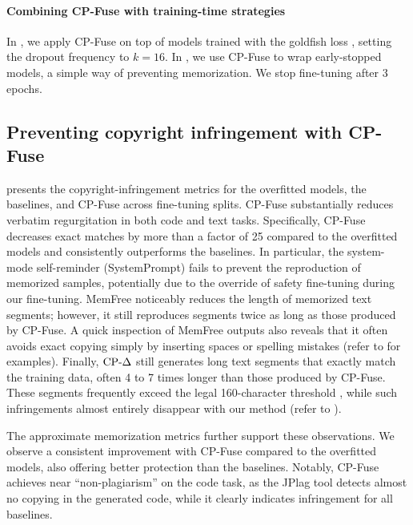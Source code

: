 \paragraph{Combining CP-Fuse with training-time strategies} In , we apply CP-Fuse on top of models trained with the goldfish loss \citep{hans2024like}, setting the dropout frequency to $k=16$. In , we use CP-Fuse to wrap early-stopped models, a simple way of preventing memorization. We stop fine-tuning after 3 epochs.



\subsection{Preventing copyright infringement with CP-Fuse}
\label{sec:exp_copyright}
 presents the copyright-infringement metrics for the overfitted models, the baselines, and CP-Fuse across fine-tuning splits. CP-Fuse substantially reduces verbatim regurgitation in both code and text tasks. Specifically, CP-Fuse decreases exact matches by more than a factor of 25 compared to the overfitted models and consistently outperforms the baselines. In particular, the system-mode self-reminder (SystemPrompt) fails to prevent the reproduction of memorized samples, potentially due to the override of safety fine-tuning during our fine-tuning. MemFree noticeably reduces the length of memorized text segments; however, it still reproduces segments twice as long as those produced by CP-Fuse. A quick inspection of MemFree outputs also reveals that it often avoids exact copying simply by inserting spaces or spelling mistakes (refer to  for examples). Finally, $\text{CP-}\Delta$ still generates long text segments that exactly match the training data, often 4 to 7 times longer than those produced by CP-Fuse. These segments frequently exceed the legal 160-character threshold \citep{mueller2024llms}, while such infringements almost entirely disappear with our method (refer to ).





The approximate memorization metrics further support these observations. We observe a consistent improvement with CP-Fuse compared to the overfitted models, also offering better protection than the baselines. Notably, CP-Fuse achieves near ``non-plagiarism'' on the code task, as the JPlag tool detects almost no copying in the generated code, while it clearly indicates infringement for all baselines. 

